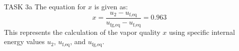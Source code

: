 TASK 3a  
The equation for \( x \) is given as:  
\[
x = \frac{u_2 - u_{\text{f,eq}}}{u_{\text{fg,eq}} - u_{\text{f,eq}}} = 0.963
\]  
This represents the calculation of the vapor quality \( x \) using specific internal energy values \( u_2 \), \( u_{\text{f,eq}} \), and \( u_{\text{fg,eq}} \).